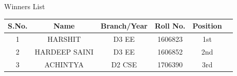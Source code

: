 \documentclass[12pt, a4 paper]{article}
\begin{document}
\begin{center}
\huge Winners List
\end{center}

\begin{table}[h!]
  \begin{center}
    \begin{tabular}{|c|c|c|c|c|c|} 
    \toprule %
      \textbf{S.No.} & \textbf{Name} & \textbf{Branch/Year} & \textbf{Roll No.} &\textbf{Position} \\
      \midrule %
      1 & HARSHIT	    & D3 EE	 & 1606823 & 1st \\
      2	& HARDEEP SAINI	& D3 EE	 & 1606852 & 2nd \\
      3	& ACHINTYA	    & D2 CSE & 1706390 & 3rd \\

      \bottomrule %
    \end{tabular}
  \end{center}
\end{table}
\end{document}
